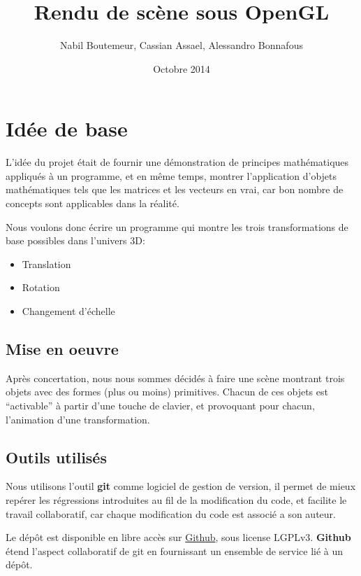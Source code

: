 \documentclass[11pt, a4paper, titlepage]{article}
\begin{document}
\title{Rendu de scène sous OpenGL}
\author{Nabil Boutemeur, Cassian Assael, Alessandro Bonnafous}
\date{Octobre 2014}
\maketitle

\tableofcontents
\pagebreak

\section{Idée de base}
L'idée du projet était de fournir une démonstration de principes mathématiques appliqués
à un programme, et en même temps, montrer l'application d'objets mathématiques tels que les
matrices et les vecteurs en vrai, car bon nombre de concepts sont applicables dans la réalité.

Nous voulons donc écrire un programme qui montre les trois transformations de base possibles dans l'univers 3D:
\begin{itemize}
\item Translation
\item Rotation
\item Changement d'échelle
\end{itemize}
\subsection{Mise en oeuvre}

Après concertation, nous nous sommes décidés à faire une scène montrant trois objets avec des formes (plus ou moins) primitives.
Chacun de ces objets est ``activable'' à partir d'une touche de clavier, et provoquant pour chacun, l'animation d'une transformation.
\pagebreak

\subsection{Outils utilisés}

Nous utilisons l'outil \textbf{git} comme logiciel de gestion de version, il permet de mieux repérer les régressions introduites au fil
de la modification du code, et facilite le travail collaboratif, car chaque modification du code est associé a son auteur.

Le dépôt est disponible en libre accès sur \href{https://github.com/nbouteme/OpenGL-Demo}{{\color{blue}Github}}, sous license LGPLv3.
\textbf{Github} étend l'aspect collaboratif de git en fournissant un ensemble de service lié à un dépôt.
\end{document}
